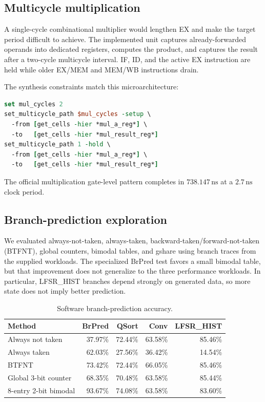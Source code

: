 \documentclass[11pt,a4paper]{article}
\newcommand{\SI}[2]{\ensuremath{#1\,\mathrm{#2}}}
\begin{document}
\subsection{Multicycle multiplication}
A single-cycle combinational multiplier would lengthen EX and make the target
period difficult to achieve.  The implemented unit captures already-forwarded
operands into dedicated registers, computes the product, and captures the
result after a two-cycle multicycle interval.  IF, ID, and the active EX
instruction are held while older EX/MEM and MEM/WB instructions drain.

The synthesis constraints match this microarchitecture:
\begin{lstlisting}[language=tcl]
set mul_cycles 2
set_multicycle_path $mul_cycles -setup \
  -from [get_cells -hier *mul_a_reg*] \
  -to   [get_cells -hier *mul_result_reg*]
set_multicycle_path 1 -hold \
  -from [get_cells -hier *mul_a_reg*] \
  -to   [get_cells -hier *mul_result_reg*]
\end{lstlisting}
The official multiplication gate-level pattern completes in
\SI{738.147}{ns} at a \SI{2.7}{ns} clock period.

\subsection{Branch-prediction exploration}
We evaluated always-not-taken, always-taken, backward-taken/forward-not-taken
(BTFNT), global counters, bimodal tables, and gshare using branch traces from
the supplied workloads.  The specialized BrPred test favors a small bimodal
table, but that improvement does not generalize to the three performance
workloads.  In particular, LFSR\_HIST branches depend strongly on generated
data, so more state does not imply better prediction.

\begin{table}[h]
\centering
\caption{Software branch-prediction accuracy.}
\label{tab:branch}
\begin{tabular}{lrrrr}
\toprule
Method & BrPred & QSort & Conv & LFSR\_HIST\\
\midrule
Always not taken & 37.97\% & 72.44\% & 63.58\% & 85.46\%\\
Always taken & 62.03\% & 27.56\% & 36.42\% & 14.54\%\\
BTFNT & 73.42\% & 72.44\% & 66.05\% & 85.46\%\\
Global 3-bit counter & 68.35\% & 70.48\% & 63.58\% & 85.44\%\\
8-entry 2-bit bimodal & 93.67\% & 74.08\% & 63.58\% & 83.60\%\\
\bottomrule
\end{tabular}
\end{table}
\end{document}
